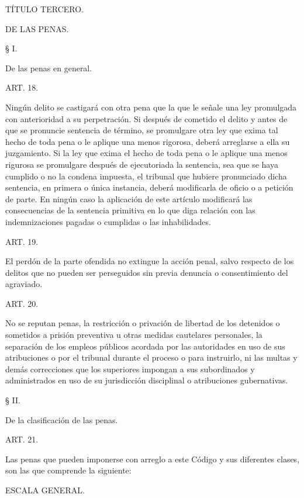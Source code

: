     TÍTULO TERCERO.

    DE LAS PENAS.



    § I.

    De las penas en general.


    ART. 18.

    Ningún delito se castigará con otra pena que la que le señale una ley promulgada con anterioridad a su perpetración.
    Si después de cometido el delito y antes de que se pronuncie sentencia de término, se promulgare otra ley que exima tal hecho de toda pena o le aplique una menos rigorosa, deberá arreglarse a ella su juzgamiento.
    Si la ley que exima el hecho de toda pena o le aplique una menos rigurosa se promulgare después de ejecutoriada la sentencia, sea que se haya cumplido o no la condena impuesta, el tribunal que hubiere pronunciado dicha sentencia, en primera o única instancia, deberá modificarla de oficio o a petición de parte.
    En ningún caso la aplicación de este artículo modificará las consecuencias de la sentencia primitiva en lo que diga relación con las indemnizaciones pagadas o cumplidas o las inhabilidades.


    ART. 19.

    El perdón de la parte ofendida no extingue la acción penal, salvo respecto de los delitos que no pueden ser perseguidos sin previa denuncia o consentimiento del agraviado.


    ART. 20.

    No se reputan penas, la restricción o privación de libertad de los detenidos o sometidos a prisión preventiva u otras medidas cautelares personales, la separación de los empleos públicos acordada por las autoridades en uso de sus atribuciones o por el tribunal durante el proceso o para instruirlo, ni las multas y demás correcciones que los superiores impongan a sus subordinados y administrados en uso de su jurisdicción disciplinal o atribuciones gubernativas.

    § II.

    De la clasificación de las penas.


    ART. 21.

    Las penas que pueden imponerse con arreglo a este Código y sus diferentes clases, son las que comprende la siguiente:

    ESCALA GENERAL.


